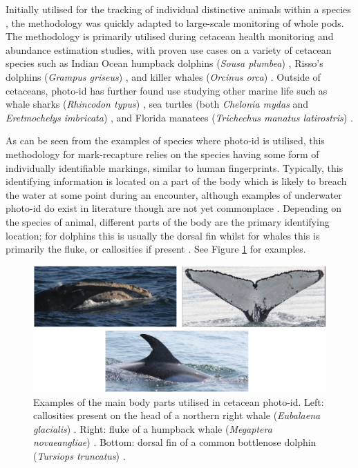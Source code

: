 Initially utilised for the tracking of individual distinctive animals within a species \cite{caldwell_evidence_1955, schevill_daily_1960}, the methodology was quickly adapted to large-scale monitoring of whole pods. The methodology is primarily utilised during cetacean health monitoring and abundance estimation studies, with proven use cases on a variety of cetacean species such as Indian Ocean humpback dolphins (\textit{Sousa plumbea}) \cite{sharpe_indian_2019}, Risso's dolphins (\textit{Grampus griseus}) \cite{miragliuolo_rissos_2004}, and killer whales (\textit{Orcinus orca}) \cite{bigg_assessment_1982}. Outside of cetaceans, photo-id has further found use studying other marine life such as whale sharks (\textit{Rhincodon typus}) \cite{holmberg_estimating_2009}, sea turtles (both \textit{Chelonia mydas} and \textit{Eretmochelys imbricata}) \cite{reisser_photographic_2008}, and Florida manatees (\textit{Trichechus manatus latirostris})  \cite{langtimm_survival_2004}. 

As can be seen from the examples of species where photo-id is utilised, this methodology for mark-recapture relies on the species having some form of individually identifiable markings, similar to human fingerprints. Typically, this identifying information is located on a part of the body which is likely to breach the water at some point during an encounter, although examples of underwater photo-id do exist in literature though are not yet commonplace \cite{vanbressem_visual_2018}. Depending on the species of animal, different parts of the body are the primary identifying location; for dolphins this is usually the dorsal fin whilst for whales this is primarily the fluke, or callosities if present \cite{vernazzani_eastern_2013, arnbom_individual_1987, constantine_abundance_2012, sharpe_indian_2019, baird_population_2009}. See Figure \ref{fig:body-parts} for examples.

\begin{figure}
	\begin{center}
		\includegraphics[scale=0.6]{Chapter2/figs/body-part-examples.png}
	\end{center}
	\caption{Examples of the main body parts utilised in cetacean photo-id. Left: callosities present on the head of a northern right whale (\textit{Eubalaena glacialis}) \cite{perrin_encyclopedia_2009}. Right: fluke of a humpback whale (\textit{Megaptera novaeangliae}) \cite{cheeseman_happywhale_2019}. Bottom: dorsal fin of a common bottlenose dolphin (\textit{Tursiops truncatus}) \cite{trotter_ndd20_2020}.
	}
	\label{fig:body-parts}
\end{figure}


